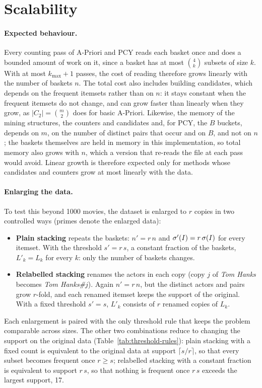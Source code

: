 \section{Scalability}
\label{sec:scalability}

\paragraph{Expected behaviour.} Every counting pass of A-Priori and PCY reads each basket once and does a bounded amount of work on it, since a basket has at most $\binom{4}{k}$ subsets of size $k$. With at most $k_{\max} + 1$ passes, the cost of reading therefore grows linearly with the number of baskets $n$. The total cost also includes building candidates, which depends on the frequent itemsets rather than on $n$: it stays constant when the frequent itemsets do not change, and can grow faster than linearly when they grow, as $|C_2| = \binom{m}{2}$ does for basic A-Priori. Likewise, the memory of the mining structures, the counters and candidates and, for PCY, the $B$ buckets, depends on $m$, on the number of distinct pairs that occur and on $B$, and not on $n$; the baskets themselves are held in memory in this implementation, so total memory also grows with $n$, which a version that re-reads the file at each pass would avoid. Linear growth is therefore expected only for methods whose candidates and counters grow at most linearly with the data.

\paragraph{Enlarging the data.} To test this beyond 1000 movies, the dataset is enlarged to $r$ copies in two controlled ways (primes denote the enlarged data):
\begin{itemize}
  \item \textbf{Plain stacking} repeats the baskets: $n' = r\,n$ and $\sigma'(I) = r\,\sigma(I)$ for every itemset. With the threshold $s' = r\,s$, a constant fraction of the baskets, $L'_k = L_k$ for every $k$: only the number of baskets changes.
  \item \textbf{Relabelled stacking} renames the actors in each copy (copy $j$ of \emph{Tom Hanks} becomes \emph{Tom Hanks\#$j$}). Again $n' = r\,n$, but the distinct actors and pairs grow $r$-fold, and each renamed itemset keeps the support of the original. With a fixed threshold $s' = s$, $L'_k$ consists of $r$ renamed copies of $L_k$.
\end{itemize}
Each enlargement is paired with the only threshold rule that keeps the problem comparable across sizes. The other two combinations reduce to changing the support on the original data (Table~\ref{tab:threshold-rules}): plain stacking with a fixed count is equivalent to the original data at support $\lceil s / r \rceil$, so that every subset becomes frequent once $r \ge s$; relabelled stacking with a constant fraction is equivalent to support $r\,s$, so that nothing is frequent once $r\,s$ exceeds the largest support, 17.

